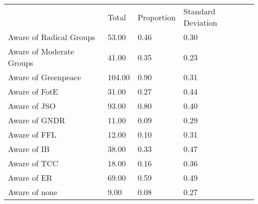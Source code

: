 \documentclass{article}
\begin{document}
\begin{table}[!h]
\centering
\begin{tabular}{llll}
\cline{1-4}
\multicolumn{1}{|l}{} &
  \multicolumn{1}{|l}{Total} &
  \multicolumn{1}{|l}{Proportion} &
  \multicolumn{1}{|l|}{Standard Deviation} \\
\cline{1-4}
\multicolumn{1}{|l}{Aware of Radical Groups} &
  \multicolumn{1}{|l}{53.00} &
  \multicolumn{1}{|l}{0.46} &
  \multicolumn{1}{|l|}{0.30} \\
\cline{1-4}
\multicolumn{1}{|l}{Aware of Moderate Groups} &
  \multicolumn{1}{|l}{41.00} &
  \multicolumn{1}{|l}{0.35} &
  \multicolumn{1}{|l|}{0.23} \\
\cline{1-4}
\multicolumn{1}{|l}{Aware of Greenpeace} &
  \multicolumn{1}{|l}{104.00} &
  \multicolumn{1}{|l}{0.90} &
  \multicolumn{1}{|l|}{0.31} \\
\cline{1-4}
\multicolumn{1}{|l}{Aware of FotE} &
  \multicolumn{1}{|l}{31.00} &
  \multicolumn{1}{|l}{0.27} &
  \multicolumn{1}{|l|}{0.44} \\
\cline{1-4}
\multicolumn{1}{|l}{Aware of JSO} &
  \multicolumn{1}{|l}{93.00} &
  \multicolumn{1}{|l}{0.80} &
  \multicolumn{1}{|l|}{0.40} \\
\cline{1-4}
\multicolumn{1}{|l}{Aware of GNDR} &
  \multicolumn{1}{|l}{11.00} &
  \multicolumn{1}{|l}{0.09} &
  \multicolumn{1}{|l|}{0.29} \\
\cline{1-4}
\multicolumn{1}{|l}{Aware of FFL} &
  \multicolumn{1}{|l}{12.00} &
  \multicolumn{1}{|l}{0.10} &
  \multicolumn{1}{|l|}{0.31} \\
\cline{1-4}
\multicolumn{1}{|l}{Aware of IB} &
  \multicolumn{1}{|l}{38.00} &
  \multicolumn{1}{|l}{0.33} &
  \multicolumn{1}{|l|}{0.47} \\
\cline{1-4}
\multicolumn{1}{|l}{Aware of TCC} &
  \multicolumn{1}{|l}{18.00} &
  \multicolumn{1}{|l}{0.16} &
  \multicolumn{1}{|l|}{0.36} \\
\cline{1-4}
\multicolumn{1}{|l}{Aware of ER} &
  \multicolumn{1}{|l}{69.00} &
  \multicolumn{1}{|l}{0.59} &
  \multicolumn{1}{|l|}{0.49} \\
\cline{1-4}
\multicolumn{1}{|l}{Aware of none} &
  \multicolumn{1}{|l}{9.00} &
  \multicolumn{1}{|l}{0.08} &
  \multicolumn{1}{|l|}{0.27} \\
\cline{1-4}
\end{tabular}
\end{table}
\end{document}
